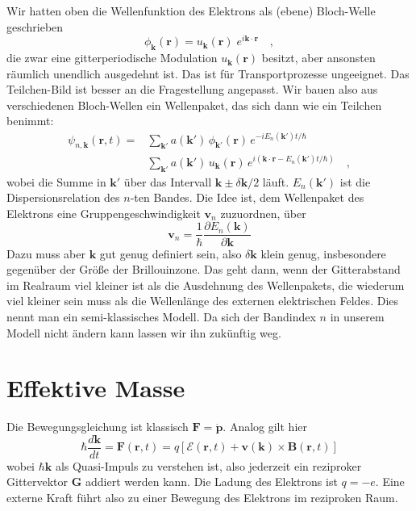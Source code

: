 Wir hatten oben die Wellenfunktion des Elektrons als (ebene) Bloch-Welle geschrieben
\begin{equation}
   \phi_\mathbf{k}(\mathbf{r}) =  u_\mathbf{k}(\mathbf{r}) \; e^{i \mathbf{k} \cdot \mathbf{r} } \quad ,
\end{equation}
die zwar eine gitterperiodische Modulation $u_\mathbf{k}(\mathbf{r})$ besitzt, aber ansonsten räumlich unendlich ausgedehnt ist. Das ist für Transportprozesse ungeeignet. Das Teilchen-Bild ist besser an die Fragestellung angepasst. Wir bauen also aus verschiedenen Bloch-Wellen ein Wellenpaket, das sich dann wie ein Teilchen benimmt:
\begin{eqnarray}
   \psi_{n, \mathbf{k}}(\mathbf{r},t) =  & \sum_{\mathbf{k}'}  a(\mathbf{k}') \, \phi_\mathbf{k'}(\mathbf{r}) \, e^{-i E_n(\mathbf{k}') t / \hbar} \\
   & \sum_{\mathbf{k}'}  a(\mathbf{k}') \,  u_\mathbf{k}(\mathbf{r}) \, e^{i (\mathbf{k} \cdot \mathbf{r}  - E_n(\mathbf{k}') t / \hbar )} \quad ,
\end{eqnarray}
wobei die Summe in $\mathbf{k}'$ über das Intervall $\mathbf{k} \pm \delta \mathbf{k} / 2$ läuft. $E_n(\mathbf{k}')$ ist die Dispersionsrelation des $n$-ten Bandes.
Die Idee ist, dem Wellenpaket des Elektrons eine Gruppengeschwindigkeit $\mathbf{v}_n$ zuzuordnen, über
\begin{equation}
   \mathbf{v}_n = \frac{1}{\hbar} \frac{\partial E_n(\mathbf{k})}{\partial \mathbf{k}} \label{eq:3_v_gruppe}
\end{equation}
Dazu muss aber $\mathbf{k}$ gut genug definiert sein, also $\delta \mathbf{k}$ klein genug, insbesondere gegenüber der Größe der Brillouinzone. Das geht dann, wenn der Gitterabstand im Realraum viel kleiner ist als die Ausdehnung des Wellenpakets, die wiederum viel kleiner sein muss als die Wellenlänge des externen elektrischen Feldes. Dies nennt man ein semi-klassisches Modell. Da sich der Bandindex $n$ in unserem Modell nicht ändern kann lassen wir ihn zukünftig weg.


\section{Effektive Masse}

Die Bewegungsgleichung ist klassisch $\mathbf{F} = \dot{\mathbf{p}}$. Analog gilt hier
\begin{equation}
   \hbar \frac{d \mathbf{k}}{dt} = \mathbf{F}(\mathbf{r}, t) = q \left[ \bm{\mathcal{E}}(\mathbf{r}, t) +   \mathbf{v}(\mathbf{k}) \times \mathbf{B}(\mathbf{r}, t)\right]
   \label{eq:2_Bewegungsgleichung}
\end{equation}
wobei $\hbar \mathbf{k}$ als Quasi-Impuls zu verstehen ist, also jederzeit ein reziproker Gittervektor $\mathbf{G}$ addiert werden kann. Die Ladung des Elektrons ist $q = -e$.
Eine externe Kraft führt also zu einer Bewegung des Elektrons im reziproken Raum.


